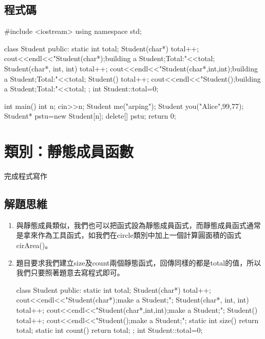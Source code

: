 \subsection{程式碼}
\begin{cppcode}
	#include <iostream>
	using namespace std;
	
	class Student{
		public:
		static int total;
		Student(char*) {
			total++;
			cout<<endl<<"Student(char*);building a Student;Total:"<<total;
		}
		Student(char*, int, int) {
			total++;
			cout<<endl<<"Student(char*,int,int);building a Student;Total:"<<total;
		}
		Student() {
			total++;
			cout<<endl<<"Student();building a Student;Total:"<<total;
		}
	};
	int Student::total=0;
	
	int main(){
		int n;
		cin>>n;
		Student me("arping");
		Student you("Alice",99,77);
		Student* pstu=new Student[n];
		delete[] pstu;
		return 0;
	}
	
\end{cppcode}

\section{類別：靜態成員函數}
完成程式寫作

\subsection{解題思維}
\begin{enumerate}
	\item 與靜態成員類似，我們也可以把函式設為靜態成員函式，而靜態成員函式通常是拿來作為工具函式，如我們在circle類別中加上一個計算圓面積的函式cirArea()。
	\item 題目要求我們建立size及count兩個靜態函式，回傳同樣的都是total的值，所以我們只要照著題意去寫程式即可。
	\begin{inside}
	class Student{
		public:
		static int total;
		Student(char*) {
			total++;
			cout<<endl<<"Student(char*);make a Student;";
		}
		Student(char*, int, int) {
			total++;
			cout<<endl<<"Student(char*,int,int);make a Student;";
		}
		Student() {
			total++;
			cout<<endl<<"Student();make a Student;";
		}
		static int size() {
			return total;
		}
		static int count() {
			return total;
		}
	};
	int Student::total=0;	
	\end{inside}
\end{enumerate} 

